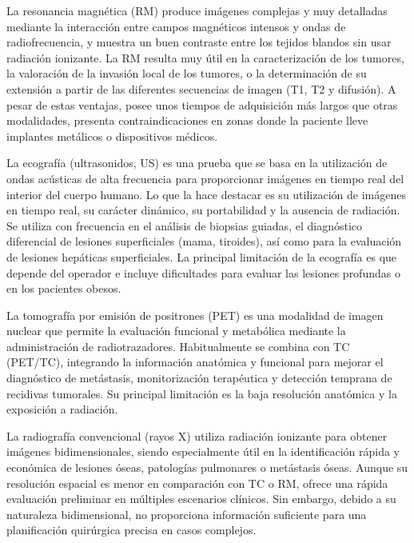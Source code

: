 La resonancia magnética (RM) produce imágenes complejas y muy detalladas mediante la interacción entre campos magnéticos intensos y ondas de radiofrecuencia, y muestra un buen contraste entre los tejidos blandos sin usar radiación ionizante. La RM resulta muy útil en la caracterización de los tumores, la valoración de la invasión local de los tumores, o la determinación de su extensión a partir de las diferentes secuencias de imagen (T1, T2 y difusión)\cite[-1.5cm]{Bortot2023}. A pesar de estas ventajas, posee unos tiempos de adquisición más largos que otras modalidades, presenta contraindicaciones en zonas donde la paciente lleve implantes metálicos o dispositivos médicos. 

La ecografía (ultrasonidos, US) es una prueba que se basa en la utilización de ondas acústicas de alta frecuencia para proporcionar imágenes en tiempo real del interior del cuerpo humano. Lo que la hace destacar es su utilización de imágenes en tiempo real, su carácter dinámico, su portabilidad y la ausencia de radiación. Se utiliza con frecuencia en el análisis de biopsias guiadas, el diagnóstico diferencial de lesiones superficiales (mama, tiroides), así como para la evaluación de lesiones hepáticas superficiales\cite[-2.2cm]{ESOBI2019}\cite{Hung2021}. La principal limitación de la ecografía es que depende del operador e incluye dificultades para evaluar las lesiones profundas o en los pacientes obesos. 

La tomografía por emisión de positrones (PET) es una modalidad de imagen nuclear que permite la evaluación funcional y metabólica mediante la administración de radiotrazadores. Habitualmente se combina con TC (PET/TC), integrando la información anatómica y funcional para mejorar el diagnóstico de metástasis, monitorización terapéutica y detección temprana de recidivas tumorales. Su principal limitación es la baja resolución anatómica y la exposición a radiación\cite{PETCTOncology2014}. 

La radiografía convencional (rayos X) utiliza radiación ionizante para obtener imágenes bidimensionales, siendo especialmente útil en la identificación rápida y económica de lesiones óseas, patologías pulmonares o metástasis óseas. Aunque su resolución espacial es menor en comparación con TC o RM, ofrece una rápida evaluación preliminar en múltiples escenarios clínicos. Sin embargo, debido a su naturaleza bidimensional, no proporciona información suficiente para una planificación quirúrgica precisa en casos complejos\cite{imagenologia_cancer}. 

